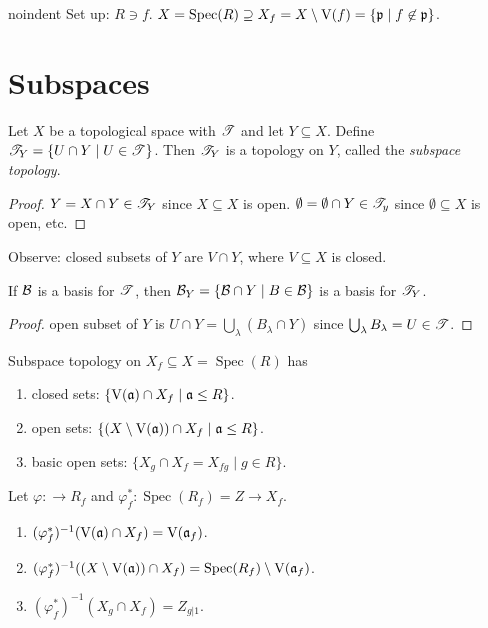 noindent Set up: $R \ni f$. $X = \operatorname{Spec}(R) \supseteq X_f = X \setminus \operatorname{V}(f) = \{\mathfrak{p} \mid f \not \in \mathfrak{p}\}$.

\section*{Subspaces}

\begin{proposition}
    Let $X$ be a topological space with $\mathscr{T}$ and let $Y \subseteq X$. Define $\mathscr{T}_Y = \{U \cap Y \mid U \in \mathscr{T}\}$. Then $\mathscr{T}_Y$ is a topology on $Y$, called the \emph{subspace topology}.
\end{proposition}

\begin{proof}
    $Y = X \cap Y \in \mathscr{T}_Y$ since $X \subseteq X$ is open. $\emptyset = \emptyset \cap Y  \in \mathscr{T}_y$ since $\emptyset \subseteq X$ is open, etc. 
\end{proof}

\noindent Observe: closed subsets of $Y$ are $V \cap Y$, where $V \subseteq X$ is closed.

\begin{proposition}
    If $\mathcal{B}$ is a basis for $\mathscr{T}$, then $\mathcal{B}_Y = \{\mathcal{B} \cap Y \mid B \in \mathcal{B}\}$ is a basis for $\mathscr{T}_Y$.
\end{proposition}

\begin{proof}
    open subset of $Y$ is $U \cap Y = \bigcup_\lambda (B_\lambda \cap Y)$ since $\bigcup_\lambda B_\lambda = U \in \mathscr{T}$.
\end{proof}

\begin{corollary}
    Subspace topology on $X_f \subseteq X = \operatorname{Spec}(R)$ has 
    \begin{enumerate}
        \item closed sets: $\{\operatorname{V}(\mathfrak{a}) \cap X_f \mid \mathfrak{a} \leq R\}$.
        \item open sets: $\{(X \setminus \operatorname{V}(\mathfrak{a}))\cap X_f \mid \mathfrak{a} \leq R\}$.
        \item basic open sets: $\{X_g \cap X_f = X_{fg} \mid g \in R\}$.
    \end{enumerate}
\end{corollary}

\begin{proposition}
    Let $\varphi: \to R_f$ and $\varphi_f^*: \operatorname{Spec}(R_f) = Z \to X_f$. 
    \begin{enumerate}
        \item 
            $(\varphi_f^*)^{-1}(\operatorname{V}(\mathfrak{a}) \cap X_f) = \operatorname{V}(\mathfrak{a}_f)$. 
        \item
            $(\varphi_f^*)^{-1}((X \setminus \operatorname{V}(\mathfrak{a})) \cap X_f) = \operatorname{Spec}(R_f) \setminus \operatorname{V}(\mathfrak{a}_f)$.
        \item 
            $(\varphi_f^*)^{-1}(X_g \cap X_f) = Z_{g|1}$.
    \end{enumerate}
\end{proposition}

